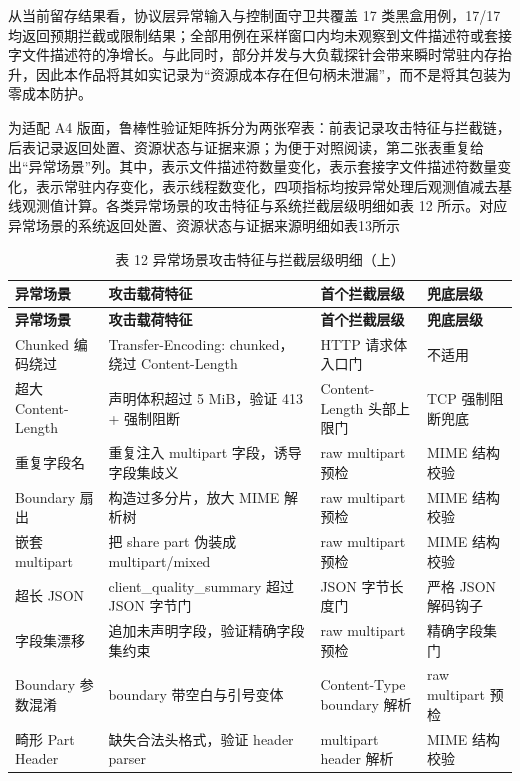 从当前留存结果看，协议层异常输入与控制面守卫共覆盖 17 类黑盒用例，17/17 均返回预期拦截或限制结果；全部用例在采样窗口内均未观察到文件描述符或套接字文件描述符的净增长。与此同时，部分并发与大负载探针会带来瞬时常驻内存抬升，因此本作品将其如实记录为“资源成本存在但句柄未泄漏”，而不是将其包装为零成本防护。

为适配 A4 版面，鲁棒性验证矩阵拆分为两张窄表：前表记录攻击特征与拦截链，后表记录返回处置、资源状态与证据来源；为便于对照阅读，第二张表重复给出“异常场景”列。其中，表示文件描述符数量变化，表示套接字文件描述符数量变化，表示常驻内存变化，表示线程数变化，四项指标均按异常处理后观测值减去基线观测值计算。各类异常场景的攻击特征与系统拦截层级明细如表 12 所示。对应异常场景的系统返回处置、资源状态与证据来源明细如表13所示

\begin{longtable}{>{\raggedright\arraybackslash}p{}>{\raggedright\arraybackslash}p{}>{\raggedright\arraybackslash}p{}>{\raggedright\arraybackslash}p{}}
\caption{表 12 异常场景攻击特征与拦截层级明细（上）}\\
\toprule
\textbf{异常场景} & \textbf{攻击载荷特征} & \textbf{首个拦截层级} & \textbf{兜底层级} \\
\midrule
\endfirsthead
\toprule
\textbf{异常场景} & \textbf{攻击载荷特征} & \textbf{首个拦截层级} & \textbf{兜底层级} \\
\midrule
\endhead
Chunked 编码绕过 & Transfer-Encoding: chunked，绕过 Content-Length & HTTP 请求体入口门 & 不适用 \\
超大 Content-Length & 声明体积超过 5 MiB，验证 413 + 强制阻断 & Content-Length 头部上限门 & TCP 强制阻断兜底 \\
重复字段名 & 重复注入 multipart 字段，诱导字段集歧义 & raw multipart 预检 & MIME 结构校验 \\
Boundary 扇出 & 构造过多分片，放大 MIME 解析树 & raw multipart 预检 & MIME 结构校验 \\
嵌套 multipart & 把 share part 伪装成 multipart/mixed & raw multipart 预检 & MIME 结构校验 \\
超长 JSON & client\_quality\_summary 超过 JSON 字节门 & JSON 字节长度门 & 严格 JSON 解码钩子 \\
字段集漂移 & 追加未声明字段，验证精确字段集约束 & raw multipart 预检 & 精确字段集门 \\
Boundary 参数混淆 & boundary 带空白与引号变体 & Content-Type boundary 解析 & raw multipart 预检 \\
畸形 Part Header & 缺失合法头格式，验证 header parser & multipart header 解析 & MIME 结构校验 \\

\end{longtable}
